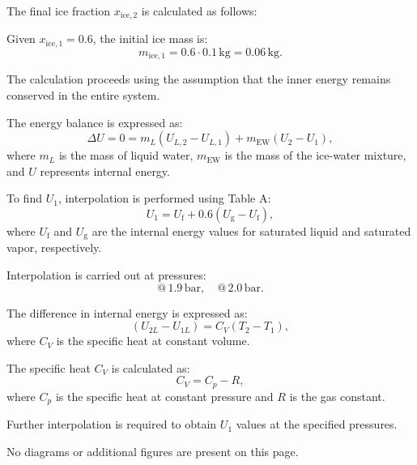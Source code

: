 The final ice fraction \( x_{\text{ice},2} \) is calculated as follows:  

Given \( x_{\text{ice},1} = 0.6 \), the initial ice mass is:  
\[
m_{\text{ice},1} = 0.6 \cdot 0.1 \, \text{kg} = 0.06 \, \text{kg}.
\]  

The calculation proceeds using the assumption that the inner energy remains conserved in the entire system.  

The energy balance is expressed as:  
\[
\Delta U = 0 = m_L (U_{L,2} - U_{L,1}) + m_{\text{EW}} (U_{2} - U_{1}),
\]  
where \( m_L \) is the mass of liquid water, \( m_{\text{EW}} \) is the mass of the ice-water mixture, and \( U \) represents internal energy.  

To find \( U_1 \), interpolation is performed using Table A:  
\[
U_1 = U_{\text{f}} + 0.6 (U_{\text{g}} - U_{\text{f}}),
\]  
where \( U_{\text{f}} \) and \( U_{\text{g}} \) are the internal energy values for saturated liquid and saturated vapor, respectively.  

Interpolation is carried out at pressures:  
\[
@ \, 1.9 \, \text{bar}, \quad @ \, 2.0 \, \text{bar}.
\]  

The difference in internal energy is expressed as:  
\[
(U_{2L} - U_{1L}) = C_V (T_2 - T_1),
\]  
where \( C_V \) is the specific heat at constant volume.  

The specific heat \( C_V \) is calculated as:  
\[
C_V = C_p - R,
\]  
where \( C_p \) is the specific heat at constant pressure and \( R \) is the gas constant.  

Further interpolation is required to obtain \( U_1 \) values at the specified pressures.  

No diagrams or additional figures are present on this page.